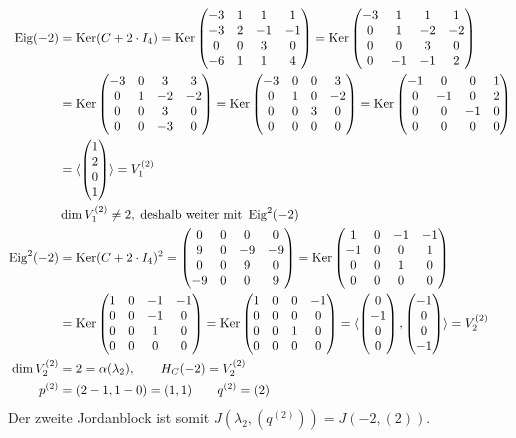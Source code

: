 \documentclass{article}
\begin{document}
\begin{align*}
\operatorname{Eig}(-2) &= \operatorname{Ker}(C + 2\cdot I_4) = \operatorname{Ker}\begin{pmatrix}-3&1&1&1\\-3&2&-1&-1\\0&0&3&0\\-6&1&1&4\end{pmatrix} = \operatorname{Ker}\begin{pmatrix}-3&1&1&1\\0&1&-2&-2\\0&0&3&0\\0&-1&-1&2\end{pmatrix}\\
&= \operatorname{Ker}\begin{pmatrix}-3&0&3&3\\0&1&-2&-2\\0&0&3&0\\0&0&-3&0\end{pmatrix} = \operatorname{Ker}\begin{pmatrix}-3&0&0&3\\0&1&0&-2\\0&0&3&0\\0&0&0&0\end{pmatrix} = \operatorname{Ker}\begin{pmatrix}-1&0&0&1\\0&-1&0&2\\0&0&-1&0\\0&0&0&0\end{pmatrix}\\
&= \langle\begin{pmatrix}1\\2\\0\\1\end{pmatrix}\rangle = V_1^{(2)}\\
&\dim V_1^{(2)} \neq 2,\; \text{deshalb weiter mit }\operatorname{Eig}^2(-2)\\
\operatorname{Eig}^2(-2) &= \operatorname{Ker}(C+2\cdot I_4)^2 = \begin{pmatrix}0&0&0&0\\9&0&-9&-9\\0&0&9&0\\-9&0&0&9\end{pmatrix} = \operatorname{Ker}\begin{pmatrix}1&0&-1&-1\\-1&0&0&1\\0&0&1&0\\0&0&0&0\end{pmatrix}\\
&= \operatorname{Ker}\begin{pmatrix}1&0&-1&-1\\0&0&-1&0\\0&0&1&0\\0&0&0&0\end{pmatrix} = \operatorname{Ker}\begin{pmatrix}1&0&0&-1\\0&0&0&0\\0&0&1&0\\0&0&0&0\end{pmatrix} = \langle\begin{pmatrix}0\\-1\\0\\0\end{pmatrix},\begin{pmatrix}-1\\0\\0\\-1\end{pmatrix}\rangle = V_2^{(2)}\\
\dim V_2^{(2)} &= 2 = \alpha(\lambda_2),\qquad H_C(-2) = V_2^{(2)}\\
p^{(2)} &= (2-1, 1-0) = (1,1)\qquad q^{(2)} = (2)
\end{align*}
Der zweite Jordanblock ist somit $J(\lambda_2,(q^{(2)})) = J(-2,(2))$.
\end{document}

